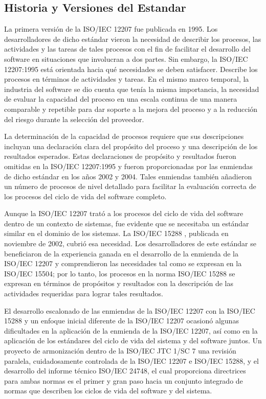 \documentclass{article}
\begin{document}
\subsection{Historia y Versiones del Estandar}\label{sec:Historia}

La primera versión de la ISO/IEC 12207 fue publicada en 1995. Los
desarrolladores de dicho estándar vieron la necesidad de describir los procesos,
las actividades y las tareas de tales procesos con el fin de facilitar el
desarrollo del software en situaciones que involucran a dos partes. Sin embargo,
la ISO/IEC 12207:1995 está orientada hacia qué necesidades se deben satisfacer.
Describe los procesos en términos de actividades y tareas. En el mismo marco
temporal, la industria del software se dio cuenta que tenía la misma importancia,
la necesidad de evaluar la capacidad del proceso en una escala continua de una
manera comparable y repetible para dar soporte a la mejora del proceso y a la
reducción del riesgo durante la selección del proveedor.

La determinación de la capacidad de procesos requiere que sus descripciones incluyan una declaración
clara del propósito del proceso y una descripción de los resultados esperados.
Estas declaraciones de propósito y resultados fueron omitidas en la ISO/IEC
12207:1995 y fueron proporcionadas por las enmiendas de dicho estándar en los
años 2002 y 2004. Tales enmiendas también añadieron un número de procesos de
nivel detallado para facilitar la evaluación correcta de los procesos del ciclo
de vida del software completo.

Aunque la ISO/IEC 12207 trató a los procesos del ciclo de vida del software dentro de un contexto de sistemas, fue evidente que
se necesitaba un estándar similar en el dominio de los sistemas. La ISO/IEC
15288 , publicada en noviembre de 2002, cubrió esa necesidad. Los
desarrolladores de este estándar se beneficiaron de la experiencia ganada en el
desarrollo de la enmienda de la ISO/IEC 12207 y comprendieron las necesidades
tal como se expresan en la ISO/IEC 15504; por lo tanto, los procesos en la norma
ISO/IEC 15288 se expresan en términos de propósitos y resultados con la
descripción de las actividades requeridas para lograr tales resultados.

El desarrollo escalonado de las enmiendas de la ISO/IEC 12207 con la ISO/IEC 15288
y un enfoque inicial diferente de la ISO/IEC 12207 ocasionó algunas dificultades
en la aplicación de la enmienda de la ISO/IEC 12207, así como en la aplicación
de los estándares del ciclo de vida del sistema y del software juntos. Un
proyecto de armonización dentro de la ISO/IEC JTC 1/SC 7 una revisión paralela,
cuidadosamente controlada de la ISO/IEC 12207 e ISO/IEC 15288, y el desarrollo
del informe técnico ISO/IEC 24748, el cual proporciona directrices para ambas
normas es el primer y gran paso hacia un conjunto integrado de normas que
describen los ciclos de vida del software y del sistema.
\end{document}

